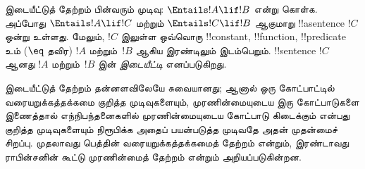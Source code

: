 \documentclass[../../../include/open-logic-section]{subfiles}
\begin{document}



இடையீட்டுத் தேற்றம் பின்வரும் முடிவு: $\Entails !A \lif !B$ என்று
கொள்க. அப்போது $\Entails !A \lif !C$ மற்றும்
$\Entails !C \lif !B$ ஆகுமாறு !!a{sentence} $!C$ ஒன்று உள்ளது.
மேலும், $!C$ இலுள்ள ஒவ்வொரு !!{constant}, !!{function},
!!{predicate} உம் ($\eq$ தவிர) $!A$ மற்றும்~$!B$ ஆகிய இரண்டிலும்
இடம்பெறும். !!{sentence} $!C$ ஆனது $!A$ மற்றும்~$!B$ இன்
\emph{இடையீட்டி} எனப்படுகிறது.

இடையீட்டுத் தேற்றம் தன்னளவிலேயே சுவையானது; ஆனால் ஒரு கோட்பாட்டில்
வரையறுக்கத்தக்கமை குறித்த முடிவுகளையும், முரணின்மையுடைய இரு
கோட்பாடுகளை இணைத்தால் எந்நிபந்தனைகளில் முரணின்மையுடைய கோட்பாடு
கிடைக்கும் என்பது குறித்த முடிவுகளையும் நிரூபிக்க அதைப் பயன்படுத்த
முடிவதே அதன் முதன்மைச் சிறப்பு. முதலாவது பெத்தின் வரையறுக்கத்தக்கமைத்
தேற்றம் என்றும், இரண்டாவது ராபின்சனின் கூட்டு முரணின்மைத் தேற்றம்
என்றும் அறியப்படுகின்றன.
\end{document}
